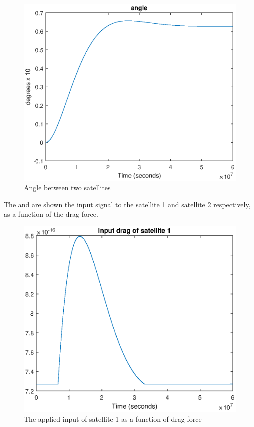 %
\begin{figure}[H]
	\centering
	\includegraphics[width=0.9\linewidth]
	{figures/distance_contro_angle.eps}
	\caption{Angle between two satellites }
	\label{fig:distancecontrol2}
\end{figure}
%
The  and  are shown the input signal to the satellite 1 and satellite 2 respectively, as a function of the drag force. 
%
\begin{figure}[H]
	\centering
	\includegraphics[width=0.9\linewidth]
	{figures/input_drag_sat1.eps}
	\caption{The applied input of satellite 1 as a function of drag force  }
	\label{fig:distancecontrol3}
\end{figure}

